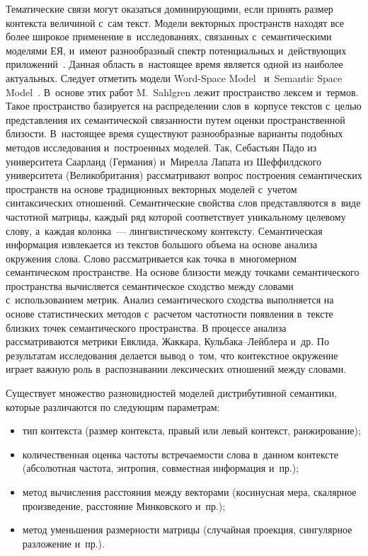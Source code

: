 \begin{multicols}{2}
     Тематические связи могут оказаться доминирующими, если принять
размер контекста величиной с~сам текст. Модели векторных пространств
находят все более широкое применение в~исследованиях, связанных с~семантическими моделями ЕЯ, и~имеют разнообразный спектр
потенциальных и~действующих приложений~\cite{14-koz, 25-koz}. Данная
область в~настоящее время является одной из наиболее актуальных. Следует
отметить модели Word-Space Model~\cite{23-koz} и~Semantic Space
Model~\cite{26-koz}. В~основе этих работ M.~Sahlgren лежит пространство
лексем и~термов. Такое пространство базируется на распределении слов в~корпусе текстов с~целью пред\-став\-ле\-ния их семантической связанности путем
оценки пространственной близости. В~настоящее время существуют
разнообразные варианты подобных методов исследования и~построенных
моделей. Так, Себастьян Падо из университета Саарланд (Германия) и~Мирелла Лапата из Шеффилдского университета (Великобритания)
рассматривают вопрос по\-стро\-ения семантических пространств на основе
традиционных векторных моделей с~учетом синтаксических отношений.
Семантические свойства слов представляются в~виде частотной матрицы,
каж\-дый ряд которой соответствует уникальному целевому слову, а~каждая
колонка~--- лингвистическому контексту. Семантическая информация
извлекается из текстов большого объема на основе анализа окружения слова.
Слово рассматривается как точка в~многомерном семантическом
пространстве. На основе близости между точками семантического
пространства вычисляется семантическое сходство между словами с~использованием метрик. Анализ семантического сходства выполняется на
основе статистических методов с~расчетом частотности появления в~тексте
близких точек семантического пространства. В процессе анализа
рассматриваются метрики Евклида, Жаккара, Куль\-ба\-ка--Лейб\-ле\-ра и~др. По результатам исследования делается вывод о~том, что контекстное
окружение играет важную роль в~распознавании лексических отношений
между словами.

     Существует множество разновидностей моделей дистрибутивной
семантики, которые различаются по следующим параметрам:
     \begin{itemize}
     \item  тип контекста (размер контекста, правый или левый контекст,
ранжирование);
     \item  количественная оценка частоты встречаемости слова в~данном
контексте (абсолютная частота, энтропия, совместная информация и~пр.);
     \item  метод вычисления расстояния между векторами (косинусная
мера, скалярное произведение, расстояние Минковского и~пр.);
     \item  метод уменьшения размерности матрицы (случайная проекция,
сингулярное разложение и~пр.).
     \end{itemize}


\end{multicols}
